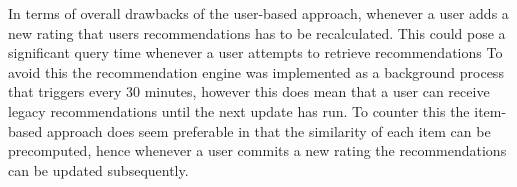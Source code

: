 In terms of overall drawbacks of the user-based approach, whenever a user adds a new rating that users recommendations has to be recalculated. This could pose a significant query time whenever a user attempts to retrieve recommendations To avoid this the recommendation engine was implemented as a background process that triggers every 30 minutes, however this does mean that a user can receive legacy recommendations until the next update has run. To counter this the item-based approach does seem preferable in that the similarity of each item can be precomputed, hence whenever a user commits a new rating the recommendations can be updated subsequently. 